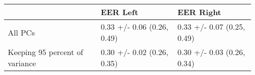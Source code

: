 \begin{tabular}{lll}
\toprule
{} &                    EER Left &                   EER Right \\
\midrule
All PCs                        &  0.33 +/- 0.06 (0.26, 0.49) &  0.33 +/- 0.07 (0.25, 0.49) \\
Keeping 95 percent of variance &  0.30 +/- 0.02 (0.26, 0.35) &  0.30 +/- 0.03 (0.26, 0.34) \\
\bottomrule
\end{tabular}
